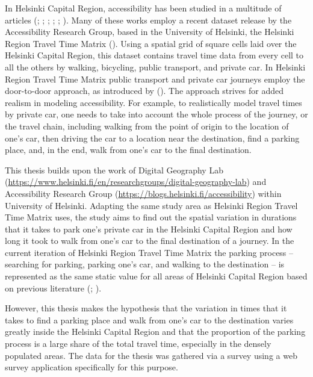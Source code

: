 In Helsinki Capital Region, accessibility has been studied in a multitude of articles (\cite{Jarvi2014}; \cite{Toivonen2014a}; \cite{Laatikainen2015}; \cite{Salonen2016}; \cite{Tenkanen2017}; \cite{Tenkanen2018}). Many of these works employ a recent dataset release by the Accessibility Research Group, based in the University of Helsinki, the Helsinki Region Travel Time Matrix (\cite{Tenkanen2018}). Using a spatial grid of square cells laid over the Helsinki Capital Region, this dataset contains travel time data from every cell to all the others by walking, bicycling, public transport, and private car. In Helsinki Region Travel Time Matrix public transport and private car journeys employ the door-to-door approach, as introduced by \citeauthor{Salonen2013} (\citeyear{Salonen2013}). The approach strives for added realism in modeling accessibility. For example, to realistically model travel times by private car, one needs to take into account the whole process of the journey, or the travel chain, including walking from the point of origin to the location of one's car, then driving the car to a location near the destination, find a parking place, and, in the end, walk from one's car to the final destination.

This thesis builds upon the work of Digital Geography Lab (\textcolor{blue}{\url{https://www.helsinki.fi/en/researchgroups/digital-geography-lab}}) and Accessibility Research Group (\textcolor{blue}{\url{https://blogs.helsinki.fi/accessibility}}) within University of Helsinki. Adapting the same study area as Helsinki Region Travel Time Matrix uses, the study aims to find out the spatial variation in durations that it takes to park one's private car in the Helsinki Capital Region and how long it took to walk from one's car to the final destination of a journey. In the current iteration of Helsinki Region Travel Time Matrix the parking process -- searching for parking, parking one's car, and walking to the destination -- is represented as the same static value for all areas of Helsinki Capital Region based on previous literature (\cite{Tenkanen2020}; \cite{Kalenoja2003}).

However, this thesis makes the hypothesis that the variation in times that it takes to find a parking place and walk from one's car to the destination varies greatly inside the Helsinki Capital Region and that the proportion of the parking process is a large share of the total travel time, especially in the densely populated areas. The data for the thesis was gathered via a survey using a web survey application specifically for this purpose.

